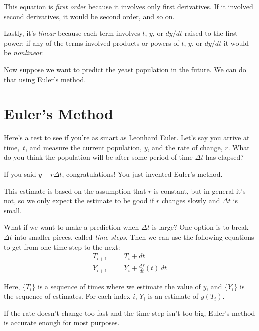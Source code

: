 
This equation is \emph{first order} because it involves only first
derivatives.  If it involved second derivatives, it would be second order,
and so on.


Lastly, it's \emph{linear} because each term involves $t$, $y$, or
$dy/dt$ raised to the first power; if any of the terms involved
products or powers of $t$, $y$, or $dy/dt$ it would be
\emph{nonlinear}.

Now suppose we want to predict the yeast population in the future.  We can do that using Euler's method.

\section{Euler's Method}

Here's a test to see if you're as smart as Leonhard Euler.  Let's say you arrive at time,~$t$, and measure the current population, $y$, and
the rate of change, $r$.  What do you think the population will
be after some period of time $\Delta t$ has elapsed?

If you said $y + r \Delta t$, congratulations!  You just invented
Euler's method.


This estimate is based on the assumption that $r$ is constant, but
in general it's not, so we only expect the estimate to be good if
$r$ changes slowly and $\Delta t$ is small. 

What if we want to make a prediction when $\Delta t$ is large?
One option is to break $\Delta t$ into smaller pieces, called
\emph{time steps}. Then we can use the following equations to get from one time step to the next:
\begin{eqnarray*}
T_{i+1} &=& T_i + dt                       \\
Y_{i+1} &=& Y_i + \frac{df}{dt}(t) \, dt          
\end{eqnarray*}

Here, $\{T_i\}$ is a sequence of times where we estimate the value
of $y$, and $\{Y_i\}$ is the sequence of estimates.  For each
index $i$, $Y_i$ is an estimate of $y(T_i)$.


If the rate doesn't change too fast and the time step isn't
too big, Euler's method is accurate enough for most purposes.  

